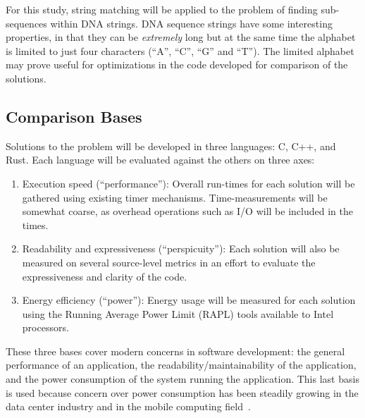 For this study, string matching will be applied to the problem of finding sub-sequences within DNA strings. DNA sequence strings have some interesting properties, in that they can be \textit{extremely} long but at the same time the alphabet is limited to just four characters (``A'', ``C'', ``G'' and ``T''). The limited alphabet may prove useful for optimizations in the code developed for comparison of the solutions.

\subsection{Comparison Bases}

Solutions to the problem will be developed in three languages: C, C++, and Rust. Each language will be evaluated against the others on three axes:

\begin{enumerate}
\item Execution speed (``performance''): Overall run-times for each solution will be gathered using existing timer mechanisms. Time-measurements will be somewhat coarse, as overhead operations such as I/O will be included in the times.
\item Readability and expressiveness (``perspicuity''): Each solution will also be measured on several source-level metrics in an effort to evaluate the expressiveness and clarity of the code.
\item Energy efficiency (``power''): Energy usage will be measured for each solution using the Running Average Power Limit (RAPL) tools available to Intel processors.
\end{enumerate}

These three bases cover modern concerns in software development: the general performance of an application, the readability/maintainability of the application, and the power consumption of the system running the application. This last basis is used because concern over power consumption has been steadily growing in the data center industry and in the mobile computing field~\cite{pereira.et.al.2017}.
